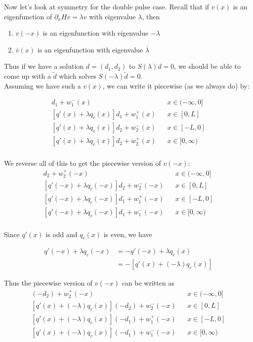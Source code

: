 \documentclass[12pt]{article}
\begin{document}
Now let's look at symmetry for the double pulse case. Recall that if $v(x)$ is an eigenfunction of $\partial_x H v = \lambda v$ with eigenvalue $\lambda$, then

\begin{enumerate}
	\item $v(-x)$ is an eigenfunction with eigenvalue $-\lambda$
	\item $\bar{v}(x)$ is an eigenfunction with eigenvalue $\bar{\lambda}$
\end{enumerate}

Thus if we have a solution $d = (d_1, d_2)$ to $S(\lambda)d = 0$, we should be able to come up with a $\tilde{d}$ which solves $S(-\lambda)\tilde{d} = 0$.\\

Assuming we have such a $v(x)$, we can write it piecewise (as we always do) by:

\begin{align*}
[q'(x) + \lambda q_c(x)]d_1 + w_1^-(x) && x \in (-\infty, 0] \\
[q'(x) + \lambda q_c(x)]d_1 + w_1^+(x) && x \in [0, L] \\
[q'(x) + \lambda q_c(x)]d_2 + w_2^-(x) && x \in [-L, 0] \\
[q'(x) + \lambda q_c(x)]d_2 + w_2^+(x) && x \in [0, \infty) \\
\end{align*}

We reverse all of this to get the piecewise version of $v(-x)$:
\begin{align*}
[q'(-x) + \lambda q_c(-x)]d_2 + w_2^+(-x) && x \in (-\infty, 0] \\
[q'(-x) + \lambda q_c(-x)]d_2 + w_2^-(-x) && x \in [0, L] \\
[q'(-x) + \lambda q_c(-x)]d_1 + w_1^+(-x) && x \in [-L, 0] \\
[q'(-x) + \lambda q_c(-x)]d_1 + w_1^-(-x) && x \in [0, \infty) \\
\end{align*}

Since $q'(x)$ is odd and $q_c(x)$ is even, we have

\begin{align*}
q'(-x) + \lambda q_c(-x) &= -q'(-x) + \lambda q_c(x) \\
&= -[q'(x) + (-\lambda)q_c(x)]
\end{align*}

Thus the piecewise version of $v(-x)$ can be written as
\begin{align*}
[q'(x) + (-\lambda) q_c(x)](-d_2) + w_2^+(-x) && x \in (-\infty, 0] \\
[q'(x) + (-\lambda) q_c(x)](-d_2) + w_2^-(-x) && x \in [0, L] \\
[q'(x) + (-\lambda) q_c(x)](-d_1) + w_1^+(-x) && x \in [-L, 0] \\
[q'(x) + (-\lambda) q_c(x)](-d_1) + w_1^-(-x) && x \in [0, \infty) \\
\end{align*}
\end{document}

